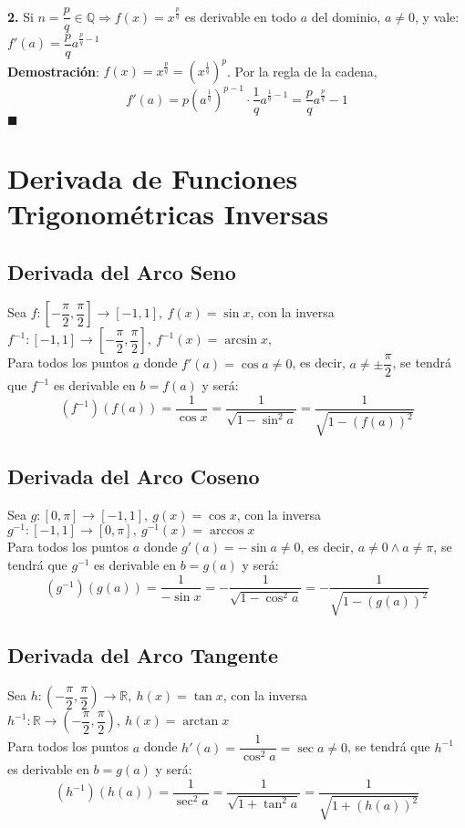 \documentclass[11pt,a4paper]{article}
\newcommand*{\QEDA}{\null\nobreak\hfill\ensuremath{\blacksquare}}
\begin{document}
\noindent \textbf{2.} Si $n=\dfrac{p}{q} \in \mathbb{Q} \Rightarrow f(x)=x^{\frac{p}{q}}$ es derivable en todo $a$ del dominio, $a\not=0$, y vale: $f'(a) = \dfrac{p}{q}a^{\frac{p}{q}-1}$\\
\textbf{Demostraci\'on}: $f(x)=x^\frac{p}{q}=(x^\frac{1}{q})^p$. Por la regla de la cadena, $$f'(a) = p(a^\frac{1}{q})^{p-1} \cdot \dfrac{1}{q}a^{\frac{1}{q}-1} = \dfrac{p}{q}a^\frac{p}{q}-1$$ \QEDA

\section{Derivada de Funciones Trigonom\'etricas Inversas}
\subsection{Derivada del Arco Seno}
Sea $f:[-\dfrac{\pi}{2}, \dfrac{\pi}{2}] \rightarrow [-1,1],\ f(x)=\sin x$, con la inversa $f^{-1}:[-1,1] \rightarrow [-\dfrac{\pi}{2}, \dfrac{\pi}{2}],\ f^{-1}(x) = \arcsin x$,\\
Para todos los puntos $a$ donde $f'(a) = \cos a\not=0$, es decir, $a\not=\pm\dfrac{\pi}{2}$, se tendr\'a que $f^{-1}$ es derivable en $b=f(a)$ y ser\'a: $$(f^{-1})(f(a)) = \dfrac{1}{\cos x} = \dfrac{1}{\sqrt{1 - \sin^2 a}} = \dfrac{1}{\sqrt{1-(f(a))^2}} $$

\subsection{Derivada del Arco Coseno}
Sea $g:[0,\pi]\rightarrow[-1,1],\ g(x)=\cos x$, con la inversa $g^{-1}:[-1,1]\rightarrow[0,\pi],\ g^{-1}(x)=\arccos x$\\
Para todos los puntos $a$ donde $g'(a) = -\sin a\not=0$, es decir, $a\not=0 \land a\not=\pi$, se tendr\'a que $g^{-1}$ es derivable en $b=g(a)$ y ser\'a: $$(g^{-1})(g(a)) = \dfrac{1}{-\sin x} = -\dfrac{1}{\sqrt{1 - \cos^2 a}} = -\dfrac{1}{\sqrt{1-(g(a))^2}} $$

\subsection{Derivada del Arco Tangente}
Sea $h: (-\dfrac{\pi}{2},\dfrac{\pi}{2})\rightarrow\mathbb{R},\ h(x)=\tan x$, con la inversa $h^{-1}:\mathbb{R}\rightarrow(-\dfrac{\pi}{2},\dfrac{\pi}{2}),\ h(x)=\arctan x$\\
Para todos los puntos $a$ donde $h'(a) = \dfrac{1}{\cos^2a}=\sec a\not=0$, se tendr\'a que $h^{-1}$ es derivable en $b=g(a)$ y ser\'a: $$(h^{-1})(h(a)) = \dfrac{1}{\sec^2 a} = \dfrac{1}{\sqrt{1 + \tan^2 a}} = \dfrac{1}{\sqrt{1 + (h(a))^2}} $$
\end{document}

